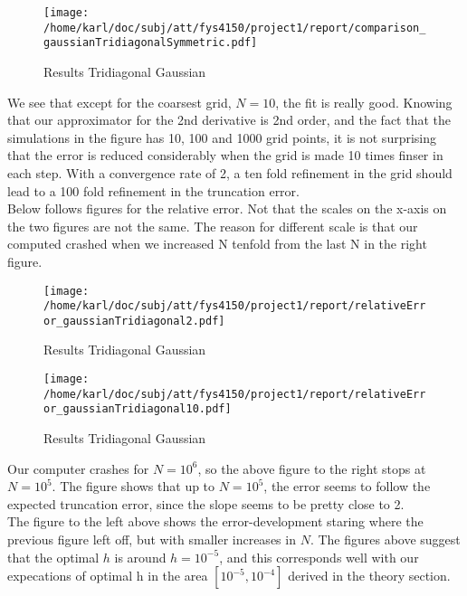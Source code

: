 \documentclass{article}
\begin{document}
\begin{figure}[H]
	\centering
	\texttt{[image: /home/karl/doc/subj/att/fys4150/project1/report/comparison\_gaussianTridiagonalSymmetric.pdf]}
	\caption{Results Tridiagonal Gaussian}
	\label{fig:comparisongaussiantridiagonalsymmetric}
\end{figure}

We see that except for the coarsest grid, $N=10$, the fit is really good. Knowing that our approximator for the 2nd derivative is 2nd order, and the fact that the simulations in the figure has 10, 100 and 1000 grid points, it is not surprising that the error is reduced considerably when the grid is made 10 times finser in each step. With a convergence rate of 2, a ten fold refinement in the grid should lead to a 100 fold refinement in the truncation error.\\

Below follows figures for the relative error. Not that the scales on the x-axis on the two figures are not the same. The reason for different scale is that our computed crashed when we increased N tenfold from the last N in the right figure.\\


\begin{minipage}{.49\textwidth} %
	\begin{figure}[H]
		\centering
		\texttt{[image: /home/karl/doc/subj/att/fys4150/project1/report/relativeError\_gaussianTridiagonal2.pdf]}
		\caption{Results Tridiagonal Gaussian}
		\label{1}
	\end{figure}
	\end{minipage}\hfill
	\begin{minipage}{.49\textwidth}
	\begin{figure}[H]
		\centering
		\texttt{[image: /home/karl/doc/subj/att/fys4150/project1/report/relativeError\_gaussianTridiagonal10.pdf]}
		\caption{Results Tridiagonal Gaussian}
		\label{1}
	\end{figure}
\end{minipage}\hfill


Our computer crashes for $N = 10^6$, so the above figure to the right stops at $N = 10^5$. The figure shows that up to $N = 10^5$, the error seems to follow the expected truncation error, since the slope seems to be pretty close to 2.\\

The figure to the left above shows the error-development staring where the previous figure left off, but with smaller increases in $N$. The figures above suggest that the optimal $h$ is around $h = 10^{-5}$, and this corresponds well with our expecations of optimal h in the area $[10^{-5}, 10^{-4}]$ derived in the theory section.\\
 
\end{document}
